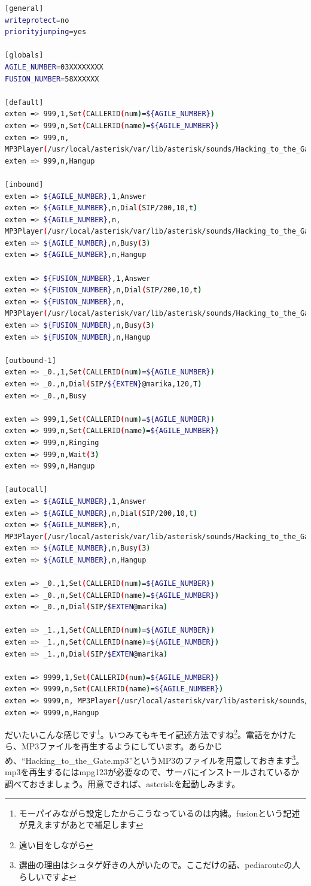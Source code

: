 \begin{lstlisting}[language=bash]
[general] 
writeprotect=no 
priorityjumping=yes 

[globals] 
AGILE_NUMBER=03XXXXXXXX
FUSION_NUMBER=58XXXXXX

[default] 
exten => 999,1,Set(CALLERID(num)=${AGILE_NUMBER}) 
exten => 999,n,Set(CALLERID(name)=${AGILE_NUMBER})
exten => 999,n,
MP3Player(/usr/local/asterisk/var/lib/asterisk/sounds/Hacking_to_the_Gate.mp3) 
exten => 999,n,Hangup 

[inbound] 
exten => ${AGILE_NUMBER},1,Answer 
exten => ${AGILE_NUMBER},n,Dial(SIP/200,10,t) 
exten => ${AGILE_NUMBER},n,
MP3Player(/usr/local/asterisk/var/lib/asterisk/sounds/Hacking_to_the_Gate.mp3) 
exten => ${AGILE_NUMBER},n,Busy(3)
exten => ${AGILE_NUMBER},n,Hangup 

exten => ${FUSION_NUMBER},1,Answer
exten => ${FUSION_NUMBER},n,Dial(SIP/200,10,t)
exten => ${FUSION_NUMBER},n,
MP3Player(/usr/local/asterisk/var/lib/asterisk/sounds/Hacking_to_the_Gate.mp3)
exten => ${FUSION_NUMBER},n,Busy(3) 
exten => ${FUSION_NUMBER},n,Hangup

[outbound-1]
exten => _0.,1,Set(CALLERID(num)=${AGILE_NUMBER}) 
exten => _0.,n,Dial(SIP/${EXTEN}@marika,120,T)
exten => _0.,n,Busy 

exten => 999,1,Set(CALLERID(num)=${AGILE_NUMBER}) 
exten => 999,n,Set(CALLERID(name)=${AGILE_NUMBER})
exten => 999,n,Ringing
exten => 999,n,Wait(3)
exten => 999,n,Hangup

[autocall]
exten => ${AGILE_NUMBER},1,Answer
exten => ${AGILE_NUMBER},n,Dial(SIP/200,10,t) 
exten => ${AGILE_NUMBER},n,
MP3Player(/usr/local/asterisk/var/lib/asterisk/sounds/Hacking_to_the_Gate.mp3)
exten => ${AGILE_NUMBER},n,Busy(3)
exten => ${AGILE_NUMBER},n,Hangup

exten => _0.,1,Set(CALLERID(num)=${AGILE_NUMBER})
exten => _0.,n,Set(CALLERID(name)=${AGILE_NUMBER})
exten => _0.,n,Dial(SIP/$EXTEN@marika)

exten => _1.,1,Set(CALLERID(num)=${AGILE_NUMBER})
exten => _1.,n,Set(CALLERID(name)=${AGILE_NUMBER})
exten => _1.,n,Dial(SIP/$EXTEN@marika)

exten => 9999,1,Set(CALLERID(num)=${AGILE_NUMBER})
exten => 9999,n,Set(CALLERID(name)=${AGILE_NUMBER})
exten => 9999,n, MP3Player(/usr/local/asterisk/var/lib/asterisk/sounds/Hacking_to_the_Gate.mp3)
exten => 9999,n,Hangup
\end{lstlisting}

だいたいこんな感じです\footnote{モーパイみながら設定したからこうなっているのは内緒。fusionという記述が見えますがあとで補足します}。いつみてもキモイ記述方法ですね\footnote{遠い目をしながら}。電話をかけたら、MP3ファイルを再生するようにしています。あらかじめ、``Hacking\_to\_the\_Gate.mp3''というMP3のファイルを用意しておきます\footnote{選曲の理由はシュタゲ好きの人がいたので。ここだけの話、pediarouteの人らしいですよ}。mp3を再生するにはmpg123が必要なので、サーバにインストールされているか調べておきましょう。用意できれば、asteriskを起動しみます。

